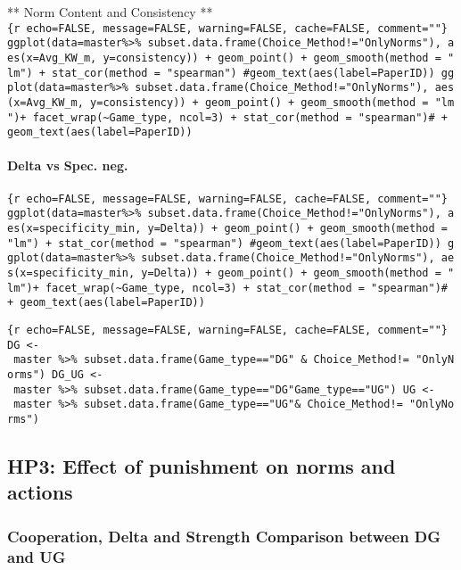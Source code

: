 ** Norm Content and Consistency **
\texttt{\{r\ echo=FALSE,\ message=FALSE,\ warning=FALSE,\ cache=FALSE,\ comment=""\}\ ggplot(data=master\%\textgreater{}\%\ subset.data.frame(Choice\_Method!="OnlyNorms"),\ aes(x=Avg\_KW\_m,\ y=consistency))\ +\ geom\_point()\ +\ geom\_smooth(method\ =\ "lm")\ +\ stat\_cor(method\ =\ "spearman")\ \#geom\_text(aes(label=PaperID))\ ggplot(data=master\%\textgreater{}\%\ subset.data.frame(Choice\_Method!="OnlyNorms"),\ aes(x=Avg\_KW\_m,\ y=consistency))\ +\ geom\_point()\ +\ geom\_smooth(method\ =\ "lm")+\ facet\_wrap(\textasciitilde{}Game\_type,\ ncol=3)\ +\ stat\_cor(method\ =\ "spearman")\#\ +\ geom\_text(aes(label=PaperID))}

\hypertarget{delta-vs-spec.-neg.}{%
\paragraph{Delta vs Spec. neg.}\label{delta-vs-spec.-neg.}}

\texttt{\{r\ echo=FALSE,\ message=FALSE,\ warning=FALSE,\ cache=FALSE,\ comment=""\}\ ggplot(data=master\%\textgreater{}\%\ subset.data.frame(Choice\_Method!="OnlyNorms"),\ aes(x=specificity\_min,\ y=Delta))\ +\ geom\_point()\ +\ geom\_smooth(method\ =\ "lm")\ +\ stat\_cor(method\ =\ "spearman")\ \#geom\_text(aes(label=PaperID))\ ggplot(data=master\%\textgreater{}\%\ subset.data.frame(Choice\_Method!="OnlyNorms"),\ aes(x=specificity\_min,\ y=Delta))\ +\ geom\_point()\ +\ geom\_smooth(method\ =\ "lm")+\ facet\_wrap(\textasciitilde{}Game\_type,\ ncol=3)\ +\ stat\_cor(method\ =\ "spearman")\#\ +\ geom\_text(aes(label=PaperID))}

\texttt{\{r\ echo=FALSE,\ message=FALSE,\ warning=FALSE,\ cache=FALSE,\ comment=""\}\ DG\ \textless{}-\ master\ \%\textgreater{}\%\ subset.data.frame(Game\_type=="DG"\ \&\ Choice\_Method!=\ "OnlyNorms")\ DG\_UG\ \textless{}-\ master\ \%\textgreater{}\%\ subset.data.frame(Game\_type=="DG"\textbar{}Game\_type=="UG")\ UG\ \textless{}-\ master\ \%\textgreater{}\%\ subset.data.frame(Game\_type=="UG"\&\ Choice\_Method!=\ "OnlyNorms")}

\hypertarget{hp3-effect-of-punishment-on-norms-and-actions}{%
\subsection{HP3: Effect of punishment on norms and
actions}\label{hp3-effect-of-punishment-on-norms-and-actions}}

\hypertarget{cooperation-delta-and-strength-comparison-between-dg-and-ug}{%
\subsubsection{Cooperation, Delta and Strength Comparison between DG and
UG}\label{cooperation-delta-and-strength-comparison-between-dg-and-ug}}

